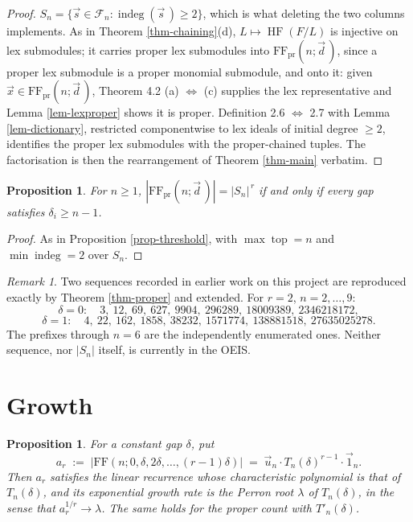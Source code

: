 \documentclass[11pt, a4paper, abstract=yes]{scrartcl}
\theoremstyle{definition}
\theoremstyle{remark}
\newtheorem{remark}[definition]{Remark}
\theoremstyle{plain}
\newtheorem{proposition}[definition]{Proposition}
\newcommand{\indeg}{\operatorname{indeg}}
\newcommand{\tp}{\operatorname{top}}
\newcommand{\HF}{\operatorname{HF}}
\begin{document}
\begin{proof}
\(S_n=\lbrace \vec s\in\mathcal F_n:\indeg(\vec s\,)\ge2\rbrace\), which is what deleting the two columns
implements. As in Theorem \ref{thm-chaining}(d), \(L\mapsto\HF(F/L)\) is injective on lex submodules; it
carries proper lex submodules into \(\mathrm{FF}_{\mathrm{pr}}(n;\vec d\,)\), since a proper lex submodule is a
proper monomial submodule, and onto it: given \(\vec x\in\mathrm{FF}_{\mathrm{pr}}(n;\vec d\,)\), Theorem 4.2
(a) \(\Leftrightarrow\) (c) supplies the lex representative and Lemma \ref{lem-lexproper} shows it is
proper. Definition 2.6 \(\Leftrightarrow\) 2.7 with Lemma \ref{lem-dictionary}, restricted componentwise
to lex ideals of initial degree \(\ge2\), identifies the proper lex submodules with the proper-chained
tuples. The factorisation is then the rearrangement of Theorem \ref{thm-main} verbatim.
\end{proof}

\begin{proposition}
For \(n\ge1\), \(|\mathrm{FF}_{\mathrm{pr}}(n;\vec d\,)|=|S_n|^{\,r}\) if and only if every gap satisfies
\(\delta_i\ge n-1\).
\label{prop-proper-threshold}
\end{proposition}

\begin{proof}
As in Proposition \ref{prop-threshold}, with \(\max\tp=n\) and \(\min\indeg=2\) over \(S_n\).
\end{proof}

\begin{remark}
Two sequences recorded in earlier work on this project are reproduced exactly by
Theorem \ref{thm-proper} and extended. For \(r=2\), \(n=2,\dots,9\):
\begin{equation}\label{eq:auto-17}
  \delta=0:\quad 3,\ 12,\ 69,\ 627,\ 9904,\ 296289,\ 18009389,\ 2346218172,
\end{equation}
\begin{equation}\label{eq:auto-18}
  \delta=1:\quad 4,\ 22,\ 162,\ 1858,\ 38232,\ 1571774,\ 138881518,\ 27635025278 .
\end{equation}
The prefixes through \(n=6\) are the independently enumerated ones. Neither sequence, nor \(|S_n|\)
itself, is currently in the OEIS.
\label{rem-proper-sequences}
\end{remark}
\section{Growth}
\label{sec-growth}
\begin{proposition}
For a constant gap \(\delta\), put
\begin{equation}\label{eq:def-ar}
  a_r\;:=\;\lvert\mathrm{FF}(n;0,\delta,2\delta,\dots,(r-1)\delta)\rvert
  \;=\;\vec u_n\cdot T_n(\delta)^{r-1}\cdot\vec 1_n .
\end{equation}
Then \(a_r\) satisfies the linear recurrence whose characteristic polynomial is
that of \(T_n(\delta)\), and its exponential growth rate is the Perron root \(\lambda\) of
\(T_n(\delta)\), in the sense that \(a_r^{1/r}\to\lambda\). The same holds for the proper count with
\(T'_n(\delta)\).
\label{prop-recurrence}
\end{proposition}
\end{document}
